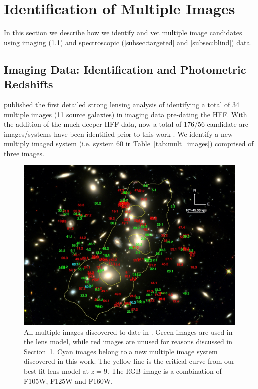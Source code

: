 \section{Identification of Multiple Images}
\label{sec:mul}

In this section we describe how we identify and vet multiple image
candidates using imaging (\ref{subsec:photometry}) and spectroscopic
(\ref{subsec:targeted} and \ref{subsec:blind}) data.

\subsection{Imaging Data: Identification and Photometric Redshifts}
\label{subsec:photometry}

\citet{2011MNRAS.417..333M} published the first detailed strong lensing analysis of \cler identifying a total of 34 multiple 
images  (11 source galaxies) in imaging data pre-dating the HFF. With the addition of the much deeper HFF data, now a total of 
176/56  candidate arc images/systems have been identified prior to this work \citep[][see also Figure~\ref{fig:arcs_image} and 
Table~\ref{tab:mult_images}]{2014ApJ...786...60A,2015ApJ...800...18A,2014ApJ...793L..12Z,2014MNRAS.444..268R,2014arXiv1409.8663J,2014ApJ...797...98L,Ish++15}.
We identify a new multiply imaged system (i.e. system 60 in Table~\ref{tab:mult_images}) comprised of three images. 

\begin{figure}
    \centering
    \includegraphics[width=\textwidth]{fig/A2744_image.pdf}
    \caption[All multiple images discovered to date in \cler.]{All multiple images discovered to date in \cler.
        Green images are used in the lens model, while red images are unused for reasons discussed in
        Section~\ref{sec:mul}. Cyan images belong to a new multiple image system discovered in this work. The
        yellow line is the critical curve from our best-fit lens model at $z=9$. The RGB image is a combination
        of F105W, F125W and F160W. }
    \label{fig:arcs_image}
\end{figure} 

